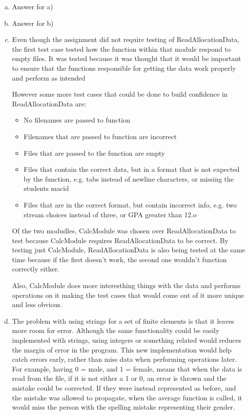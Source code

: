 \documentclass[12pt]{article}
\begin{document}
\begin{enumerate}[(a)]

\item Answer for a)

\item Answer for b)

\item Even though the assignment did not require testing of ReadAllocationData, the 
first test case tested how the function within that module respond to empty files. 
It was tested because it was thought that it would be important to ensure that the
functions responsible for getting the data work properly and perform as intended

However some more test cases that could be done to build confidence in ReadAllocationData
are:

\begin{itemize}
\item No filenames are passed to function
\item Filenames that are passed to function are incorrect
\item Files that are passed to the function are empty
\item Files that contain the correct data, but in a format that is not expected
by the function, e.g. tabs instead of newline characters, or missing the students 
macid
\item Files that are in the correct format, but contain incorrect info, e.g. two 
stream choices instead of three, or GPA greater than 12.o
\end{itemize}

Of the two modudles, CalcModule was chosen over ReadAllocationData to test because
CalcModule requires ReadAllocationData to be correct. By testing just CalcModule,
ReadAllocationData is also being tested at the same time because if the first doesn't
work, the second one wouldn't function correctly either.

Also, CalcModule does more interesthing things with the data and performs operations on it
making the test cases that would come out of it more unique and less obvious.

\item The problem with using strings for a set of finite elements is that it leaves
more room for error. Although the same functionality could be easily implemented with
strings, using integers or something related would reduces the margin of error in the
program. This new implementation would help catch errors early, rather than miss data
when performing operations later. For example, having 0 = male, and 1 = female, means
that when the data is read from the file, if it is not either a 1 or 0, an error is 
thrown and the mistake could be corrected. If they were instead represented as before,
and the mistake was allowed to propagate, when the average function is called, it would
miss the person with the spelling mistake representing their gender.


\end{enumerate}
\end{document}

